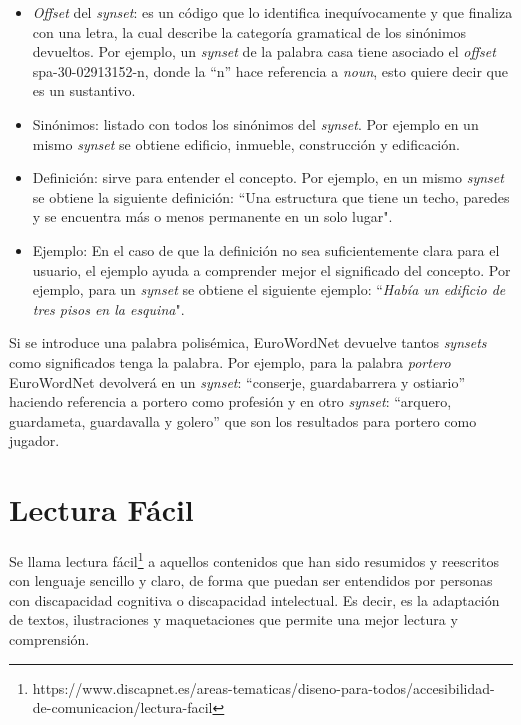 

\begin{itemize}
	
	\item \textit{Offset} del \textit{synset}: es un código que lo identifica inequívocamente y que finaliza con una letra, la cual describe la categoría gramatical de los sinónimos devueltos. Por ejemplo, un \textit{synset} de la palabra casa tiene asociado el \textit{offset} spa-30-02913152-n, donde la ``n'' hace referencia a \textit{noun}, esto quiere decir que es un sustantivo. 
	\item Sinónimos: listado con todos los sinónimos del \textit{synset}. Por ejemplo en un mismo \textit{synset} se obtiene edificio, inmueble, construcción y edificación.
	\item Definición: sirve para entender el concepto. Por ejemplo, en un mismo \textit{synset} se obtiene la siguiente definición: ``Una estructura que tiene un techo, paredes y se encuentra más o menos permanente en un solo lugar".
	\item Ejemplo: En el caso de que la definición no sea suficientemente clara para el usuario, el ejemplo ayuda a comprender mejor el significado del concepto. Por ejemplo, para un \textit{synset} se obtiene el siguiente ejemplo: ``\textit{Había un edificio de tres pisos en la esquina}". 
\end{itemize} 

Si se introduce una palabra polisémica, EuroWordNet devuelve tantos \textit{synsets} como significados tenga la palabra.
Por ejemplo, para la palabra \textit{portero} EuroWordNet devolverá en un \textit{synset}: ``conserje, guardabarrera y ostiario'' haciendo referencia a portero como profesión y en otro \textit{synset}: ``arquero, guardameta, guardavalla y golero'' que son los resultados para portero como jugador. 



\section{Lectura Fácil}
\label{cap:sec:lecturafacil}

Se llama lectura fácil\footnote{https://www.discapnet.es/areas-tematicas/diseno-para-todos/accesibilidad-de-comunicacion/lectura-facil} a aquellos contenidos que han sido resumidos y reescritos con lenguaje sencillo y claro, de forma que puedan ser entendidos por personas con discapacidad cognitiva o discapacidad intelectual. Es decir, es la adaptación de textos, ilustraciones y maquetaciones que permite una mejor lectura y comprensión.

